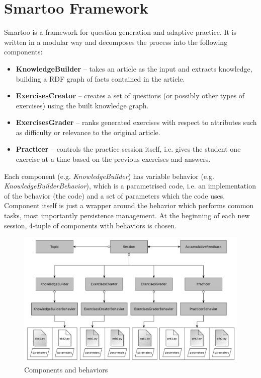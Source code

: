 \documentclass[12pt, twoside]{fithesis2}
\renewcommand{\_}{\leavevmode \kern0.07em\vbox{\hrule width0.4em}}
\newcommand{\squarebullet}{\textcolor{black}{\raisebox{0.15em}{\rule{4pt}{4pt}}}}
\newcommand{\emptysquarebullet}{\textcolor{black}{\raisebox{0.10em}{\tiny$\square$}}}
\newenvironment{myItemize}{
  \begin{itemize}[leftmargin=2em,rightmargin=1em,itemsep=\parskip ,parsep=0em,topsep=0em,partopsep=0em]
  \renewcommand{\labelitemi}{\squarebullet}
  \renewcommand{\labelitemii}{\textbullet}
}{
  \end{itemize}
}
\begin{document}
\chapter{Smartoo Framework}
\label{chap:smartoo}

Smartoo is a framework for question generation and adaptive practice.
It is written in a modular way and decomposes the process into the following components:
\begin{myItemize}
\item \textbf{KnowledgeBuilder} -- takes an article as the input and extracts knowledge, building a RDF graph of facts contained in the article.
\item \textbf{ExercisesCreator} -- creates a set of questions (or possibly other types of exercises) using the built knowledge graph.
\item \textbf{ExercisesGrader} -- ranks generated exercises with respect to attributes such as difficulty or relevance to the original article.
\item \textbf{Practicer} -- controls the practice session itself, i.e. gives the student one exercise at a time based on the previous exercises and answers.
\end{myItemize}
Each component (e.g. \textit{KnowledgeBuilder}) has variable behavior (e.g. \textit{KnowledgeBuilderBehavior}), which is a parametrised code, i.e. an implementation of the behavior (the code) and a set of parameters which the code uses.
Component itself is just a wrapper around the behavior which performs common tasks, most importantly persistence management.
At the beginning of each new session, 4-tuple of components with behaviors is chosen.%

\begin{figure}[h]
  \centering
  \includegraphics[width=\textwidth]{images/architecture.pdf}
  \caption{Components and behaviors}
  \label{fig:smartoo-architecture}
\end{figure}
\end{document}
